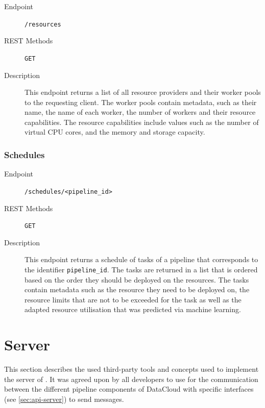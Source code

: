\documentclass{article}
\begin{document}
            \begin{description}
                \item[Endpoint] \texttt{/resources}
                \item[REST Methods] \texttt{GET}
                \item[Description] This endpoint returns a list of all resource providers and their worker pools to the requesting client. The worker pools contain metadata, such as their name, the name of each worker, the number of workers and their resource capabilities. The resource capabilities include values such as the number of virtual CPU cores, and the memory and storage capacity.
            \end{description}

            \subsubsection{Schedules}

            \begin{description}
                \item[Endpoint] \texttt{/schedules/<pipeline\_id>}
                \item[REST Methods] \texttt{GET}
                \item[Description] This endpoint returns a schedule of tasks of a pipeline that corresponds to the identifier \texttt{pipeline\_id}. The tasks are returned in a list that is ordered based on the order they should be deployed on the resources. The tasks contain metadata such as the resource they need to be deployed on, the resource limits that are not to be exceeded for the task as well as the adapted resource utilisation that was predicted via machine learning.
            \end{description}

    \section{Server}
    \label{sec:server}

        This section describes the used third-party tools and concepts used to implement the server of .
        It was agreed upon by all developers to use  for the communication between the different pipeline components of DataCloud with specific interfaces (see \ref{sec:api-server}) to send messages.

\end{document}
